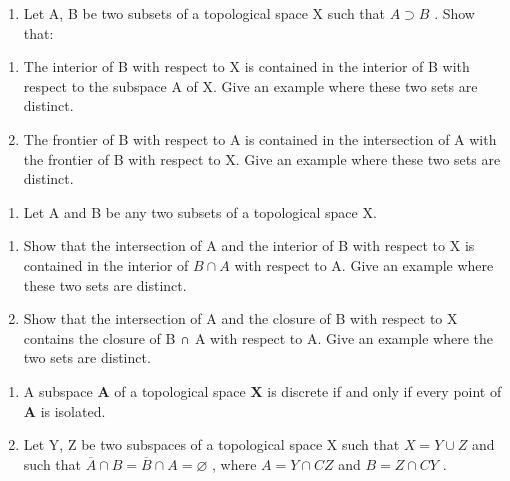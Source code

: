 \BourbakiExerciseGroup

\begin{enumerate}
\def\labelenumi{\arabic{enumi})}
\tightlist
\item
  Let A, B be two subsets of a topological space X such that \(A \supset B\) . Show that:
\end{enumerate}

\begin{enumerate}
\def\labelenumi{\alph{enumi})}
\item
  The interior of B with respect to X is contained in the interior of B with respect to the subspace A of X. Give an example where these two sets are distinct.
\item
  The frontier of B with respect to A is contained in the intersection of A with the frontier of B with respect to X. Give an example where these two sets are distinct.
\end{enumerate}

\begin{enumerate}
\def\labelenumi{\arabic{enumi})}
\setcounter{enumi}{1}
\tightlist
\item
  Let A and B be any two subsets of a topological space X.
\end{enumerate}

\begin{enumerate}
\def\labelenumi{\alph{enumi})}
\item
  Show that the intersection of A and the interior of B with respect to X is contained in the interior of \(B \cap A\) with respect to A. Give an example where these two sets are distinct.
\item
  Show that the intersection of A and the closure of B with respect to X contains the closure of B ∩ A with respect to A. Give an example where the two sets are distinct.
\end{enumerate}

\begin{enumerate}
\def\labelenumi{\arabic{enumi})}
\setcounter{enumi}{2}
\item
  A subspace \(\mathbf{A}\) of a topological space \(\mathbf{X}\) is discrete if and only if every point of \(\mathbf{A}\) is isolated.
\item
  Let Y, Z be two subspaces of a topological space X such that \(X = Y \cup Z\) and such that \(\overline{A} \cap B = \overline{B} \cap A = \varnothing\) , where \(A = Y \cap CZ\) and \(B = Z \cap CY\) .
\end{enumerate}

